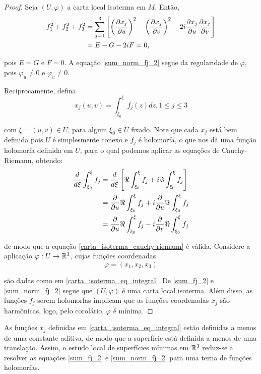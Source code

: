 \begin{proof}
	Seja $(U, \varphi)$ a carta local isoterma em $M$. Então,
	\begin{align*}
		f_1^2 + f_2^2 + f_3^2 &= \sum_{j=1}^{3} \left[ \left( \frac{\partial x_j}{\partial u} \right)^2 - \left( \frac{\partial x_j}{\partial v} \right)^2 - 2i \frac{\partial x_j}{\partial u} \frac{\partial x_j}{\partial v} \right]\\
		&= E - G - 2iF = 0,
	\end{align*}
	
	pois $E=G$ e $F=0$. A equação \ref{sum_norm_fj_2} segue da regularidade de $\varphi$, pois $\varphi_u \neq 0$ e $\varphi_v \neq 0$.
	
	Reciprocamente, defina
	\begin{equation}\label{carta_isoterma_eq_integral}
		x_j(u,v) = \int_{\xi_0}^{\xi} f_j(z) dz, 1 \leq j \leq 3
	\end{equation}
	
	com $\xi = (u,v) \in U$, para algum $\xi_0 \in U$ fixado. Note que cada $x_j$ está bem definida pois $U$ é simplesmente conexo e $f_j$ é holomorfa, o que nos dá uma função holomorfa definida em $U$, para o qual podemos aplicar as equações de Cauchy-Riemann, obtendo:
	\begin{align*}
		\frac{d}{d \xi} \int_{\xi_0}^{\xi} f_j &= \frac{d}{d \xi} \left[ \Re \int_{\xi_0}^{\xi} f_j + i \Im \int_{\xi_0}^{\xi} f_j \right]\\
		&= \frac{\partial}{\partial u} \Re \int_{\xi_0}^{\xi} f_j + i \frac{\partial}{\partial u} \Im \int_{\xi_0}^{\xi} f_j\\
		&= \frac{\partial}{\partial u} \Re \int_{\xi_0}^{\xi} f_j - i \frac{\partial}{\partial v} \Re \int_{\xi_0}^{\xi} f_j
	\end{align*}
	
	de modo que a equação \ref{carta_isoterma_cauchy-riemann} é válida. Considere a aplicação $\varphi: U \rightarrow \mathbb{R}^3$, cujas funções coordenadas
	\begin{equation*}
		\varphi = (x_1,x_2,x_3)
	\end{equation*}
	
	são dadas como em \ref{carta_isoterma_eq_integral}. De \ref{sum_fj_2} e \ref{sum_norm_fj_2} segue que $(U,\varphi)$ é uma carta local isoterma. Além disso, as funções $f_j$ serem holomorfas implicam que as funções coordenadas $x_j$ são harmônicas, logo, pelo corolário, $\varphi$ é mínima.
\end{proof}

\begin{obse}
	As funções $x_j$ definidas em \ref{carta_isoterma_eq_integral} estão definidas a menos de uma constante aditiva, de modo que a superfície está definida a menos de uma translação. Assim, o estudo local de superfícies mínimas em $\mathbb{R}^3$ reduz-se a resolver as equações \ref{sum_fj_2} e \ref*{sum_norm_fj_2} para uma terna de funções holomorfas.
\end{obse}

